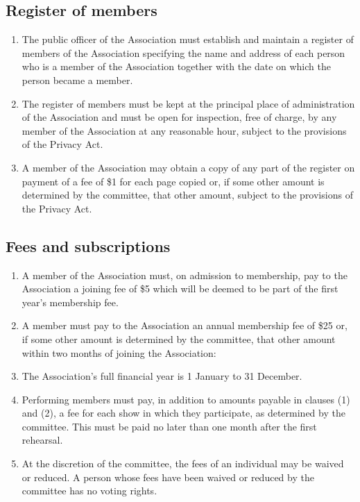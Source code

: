 \documentclass{article}
\begin{document}
\subsection{Register of members}
\begin{enumerate}
    \item The public officer of the Association must establish and maintain a register of members of the Association specifying the name and address of each person who is a member of the Association together with the date on which the person became a member.
    \item The register of members must be kept at the principal place of administration of the Association and must be open for inspection, free of charge, by any member of the Association at any reasonable hour, subject to the provisions of the Privacy Act.
    \item A member of the Association may obtain a copy of any part of the register on payment of a fee of \$1 for each page copied or, if some other amount is determined by the committee, that other amount, subject to the provisions of the Privacy Act.
\end{enumerate}
\subsection{Fees and subscriptions}
\begin{enumerate}
    \item A member of the Association must, on admission to membership, pay to the Association a joining fee of \$5 which will be deemed to be part of the first year’s membership fee.
   \item A member must pay to the Association an annual membership fee of \$25 or, if some other amount is determined by the committee, that other amount within two months of joining the Association: 
   \item The Association’s full financial year is 1 January to 31 December.
   \item Performing members must pay, in addition to amounts payable in clauses (1) and (2), a fee for each show in which they participate, as determined by the committee.  This must be paid no later than one month after the first rehearsal.
   \item At the discretion of the committee, the fees of an individual may be waived or reduced. A person whose fees have been waived or reduced by the committee has no voting rights.
\end{enumerate}
\end{document}
